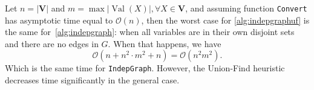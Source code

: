 \documentclass{amsart}
\DeclareMathOperator*{\Val}{\text{Val}}
\theoremstyle{plain}
\numberwithin{equation}{section}
\newcommand{\set}[1]{\mathbf{#1}}
\newcommand{\bigo}{\mathcal{O}}
\newcommand{\code}[1]{\lstinline[mathescape=true]{#1}}
\begin{document}
Let $n=|\set{V}|$ and $m=\max |\Val(X)|, \forall X\in\set{V}$, and assuming function \code{Convert}
has asymptotic time equal to $\bigo(n)$, then the worst case for \autoref{alg:indepgraphuf} is the
same for~\autoref{alg:indepgraph}: when all variables are in their own disjoint sets and there are
no edges in $G$. When that happens, we have
\begin{equation*}
  \bigo(n + n^2\cdot m^2 + n) = \bigo(n^2 m^2).
\end{equation*}
Which is the same time for \code{IndepGraph}. However, the Union-Find heuristic decreases time
significantly in the general case.


\newpage
\appendix

\newpage

\printbibliography[]
\end{document}
